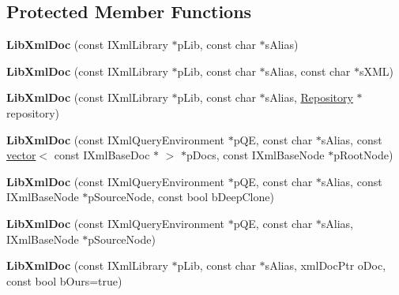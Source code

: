 \subsection*{\-Protected \-Member \-Functions}
\begin{DoxyCompactItemize}
\item 
\hypertarget{classgeneral__server_1_1LibXmlDoc_ab5020492e55dd0759b2153948b92de37}{{\bfseries \-Lib\-Xml\-Doc} (const \-I\-Xml\-Library $\ast$p\-Lib, const char $\ast$s\-Alias)}\label{classgeneral__server_1_1LibXmlDoc_ab5020492e55dd0759b2153948b92de37}

\item 
\hypertarget{classgeneral__server_1_1LibXmlDoc_aadddbde12e542b2d4d5536f0409d848f}{{\bfseries \-Lib\-Xml\-Doc} (const \-I\-Xml\-Library $\ast$p\-Lib, const char $\ast$s\-Alias, const char $\ast$s\-X\-M\-L)}\label{classgeneral__server_1_1LibXmlDoc_aadddbde12e542b2d4d5536f0409d848f}

\item 
\hypertarget{classgeneral__server_1_1LibXmlDoc_aa9b0e394dd14496c6544262b2e38b59e}{{\bfseries \-Lib\-Xml\-Doc} (const \-I\-Xml\-Library $\ast$p\-Lib, const char $\ast$s\-Alias, \hyperlink{classgeneral__server_1_1Repository}{\-Repository} $\ast$repository)}\label{classgeneral__server_1_1LibXmlDoc_aa9b0e394dd14496c6544262b2e38b59e}

\item 
\hypertarget{classgeneral__server_1_1LibXmlDoc_a41908f67e168a069de6c384ea9b44d31}{{\bfseries \-Lib\-Xml\-Doc} (const \-I\-Xml\-Query\-Environment $\ast$p\-Q\-E, const char $\ast$s\-Alias, const \hyperlink{classvector}{vector}$<$ const \-I\-Xml\-Base\-Doc $\ast$ $>$ $\ast$p\-Docs, const \-I\-Xml\-Base\-Node $\ast$p\-Root\-Node)}\label{classgeneral__server_1_1LibXmlDoc_a41908f67e168a069de6c384ea9b44d31}

\item 
\hypertarget{classgeneral__server_1_1LibXmlDoc_af2654986d9075d02b6143d7e9fc9321e}{{\bfseries \-Lib\-Xml\-Doc} (const \-I\-Xml\-Query\-Environment $\ast$p\-Q\-E, const char $\ast$s\-Alias, const \-I\-Xml\-Base\-Node $\ast$p\-Source\-Node, const bool b\-Deep\-Clone)}\label{classgeneral__server_1_1LibXmlDoc_af2654986d9075d02b6143d7e9fc9321e}

\item 
\hypertarget{classgeneral__server_1_1LibXmlDoc_a7ed9d6cbc26cf0b98da0d009d594a822}{{\bfseries \-Lib\-Xml\-Doc} (const \-I\-Xml\-Query\-Environment $\ast$p\-Q\-E, const char $\ast$s\-Alias, \-I\-Xml\-Base\-Node $\ast$p\-Source\-Node)}\label{classgeneral__server_1_1LibXmlDoc_a7ed9d6cbc26cf0b98da0d009d594a822}

\item 
\hypertarget{classgeneral__server_1_1LibXmlDoc_a6a055c7b0a80a33740e4cecfb0af17b7}{{\bfseries \-Lib\-Xml\-Doc} (const \-I\-Xml\-Library $\ast$p\-Lib, const char $\ast$s\-Alias, xml\-Doc\-Ptr o\-Doc, const bool b\-Ours=true)}\label{classgeneral__server_1_1LibXmlDoc_a6a055c7b0a80a33740e4cecfb0af17b7}

\end{DoxyCompactItemize}
